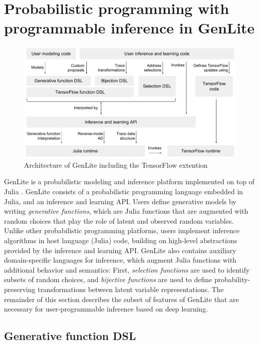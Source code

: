 \section{Probabilistic programming with programmable inference in GenLite}

\begin{figure}[t]
\centering
    \includegraphics[width=\textwidth]{images/genlite-schematic.pdf}
    \caption{Architecture of GenLite including the TensorFlow extention}
    \label{fig:genlite-schematic}
\end{figure}

GenLite is a probabilistic modeling and inference platform implemented on top of Julia \cite{TODO}.
GenLite consists of a probabilistic programming language embedded in Julia, and an inference and learning API.
Users define generative models by writing \emph{generative functions}, which are Julia functions that are augmented with random choices that play the role of latent and observed random variables.
Unlike other probabilistic programming platforms, users implement inference algorithms in host language (Julia) code, building on high-level abstractions provided by the inference and learning API.
GenLite also contains auxiliary domain-specific languages for inference, which augment Julia functions with additional behavior and semantics:
First, \emph{selection functions} are used to identify subsets of random choices, and \emph{bijective functions} are used to define probability-preserving transformations between latent variable representations.
The remainder of this section describes the subset of features of GenLite that are necessary for user-programmable inference based on deep learning.

\subsection{Generative function DSL}


